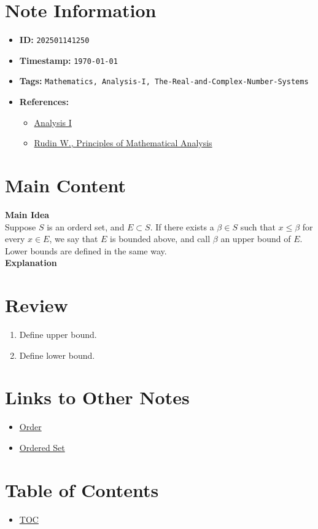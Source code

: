 \clearpage
{}
\label{202501141250}
\renewcommand{\notetitle}{Upper Bounds and Lower Bounds}

\section*{Note Information}
\begin{itemize}
  \item \textbf{ID:} \texttt{202501141250}
  \item \textbf{Timestamp:} \texttt{\today \ \currenttime}
  \item \textbf{Tags:} \texttt{Mathematics, Analysis-I, The-Real-and-Complex-Number-Systems}
  \item \textbf{References:}
    \begin{itemize}
      \item \href{https://ocw.mit.edu/courses/18-100b-analysis-i-fall-2010/}{Analysis I}
      \item \href{/home/garrett/Personal/References/Mathematics/Analysis-I/Rudin.pdf}{Rudin W., Principles of Mathematical Analysis}
    \end{itemize}
\end{itemize}


\section*{Main Content}
\textbf{Main Idea}\\
Suppose $S$ is an orderd set, and $E \subset S$. If there exists a $\beta \in S$ such that $x \leq \beta$ for every $x \in E$, we say that $E$ is bounded above, and call $\beta$ an upper bound of $E$. Lower bounds are defined in the same way.\\

\textbf{Explanation}\\


\section*{Review}
\begin{enumerate}
  \item Define upper bound. 
  \item Define lower bound.
\end{enumerate}


\section*{Links to Other Notes}
\begin{itemize}
  \item \hyperref[202501141228]{Order}
  \item \hyperref[202501141241]{Ordered Set}
\end{itemize}

\section*{Table of Contents}

\begin{itemize}
  \item \hyperref[toc]{TOC}
\end{itemize}

